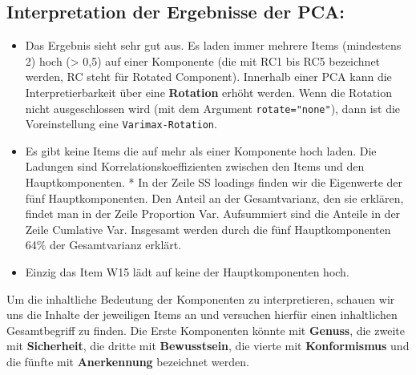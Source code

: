 \documentclass[12pt,ngerman,]{book}
\begin{document}
\subsection{Interpretation der Ergebnisse der
PCA:}\label{interpretation-der-ergebnisse-der-pca}

\begin{itemize}
\item
  Das Ergebnis sieht sehr gut aus. Es laden immer mehrere Items
  (mindestens 2) hoch (\textgreater{} 0,5) auf einer Komponente (die mit
  RC1 bis RC5 bezeichnet werden, RC steht für Rotated Component).
  Innerhalb einer PCA kann die Interpretierbarkeit über eine
  \textbf{Rotation} erhöht werden. Wenn die Rotation nicht
  ausgeschlossen wird (mit dem Argument \texttt{rotate="none"}), dann
  ist die Voreinstellung eine \texttt{Varimax-Rotation}.
\item
  Es gibt keine Items die auf mehr als einer Komponente hoch laden. Die
  Ladungen sind Korrelationskoeffizienten zwischen den Items und den
  Hauptkomponenten. * In der Zeile SS loadings finden wir die Eigenwerte
  der fünf Hauptkomponenten. Den Anteil an der Gesamtvarianz, den sie
  erklären, findet man in der Zeile Proportion Var. Aufsummiert sind die
  Anteile in der Zeile Cumlative Var. Insgesamt werden durch die fünf
  Hauptkomponenten 64\% der Gesamtvarianz erklärt.
\item
  Einzig das Item W15 lädt auf keine der Hauptkomponenten hoch.
\end{itemize}

Um die inhaltliche Bedeutung der Komponenten zu interpretieren, schauen
wir uns die Inhalte der jeweiligen Items an und versuchen hierfür einen
inhaltlichen Gesamtbegriff zu finden. Die Erste Komponenten könnte mit
\textbf{Genuss}, die zweite mit \textbf{Sicherheit}, die dritte mit
\textbf{Bewusstsein}, die vierte mit \textbf{Konformismus} und die
fünfte mit \textbf{Anerkennung} bezeichnet werden.
\end{document}
